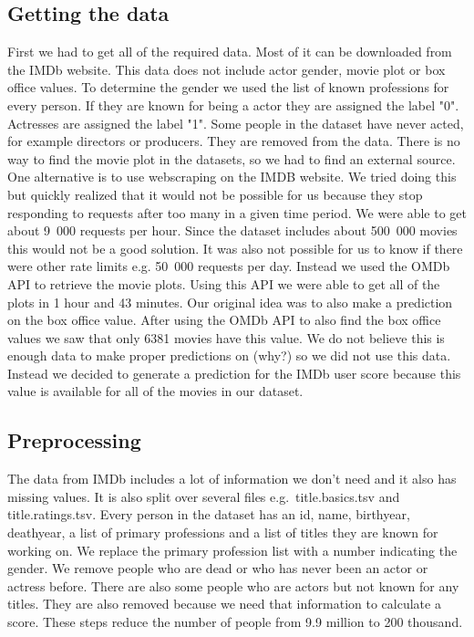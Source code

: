 
\subsection{Getting the data} 
First we had to get all of the required data. Most of it can be downloaded from the IMDb website\cite{IMDbInterfaces}. This data does not include actor gender, movie plot or box office values. To determine the gender we used the list of known professions for every person. If they are known for being a actor they are assigned the label "0". Actresses are assigned the label "1". Some people in the dataset have never acted, for example directors or producers. They are removed from the data. There is no way to find the movie plot in the datasets, so we had to find an external source. One alternative is to use webscraping on the IMDB website. We tried doing this but quickly realized that it would not be possible for us because they stop responding to requests after too many in a given time period. We were able to get about 9~000 requests per hour. Since the dataset includes about 500~000 movies this would not be a good solution. It was also not possible for us to know if there were other rate limits e.g. 50~000 requests per day. Instead we used the OMDb API\cite{OMDb} to retrieve the movie plots. Using this API we were able to get all of the plots in 1 hour and 43 minutes. Our original idea was to also make a prediction on the box office value. After using the OMDb API to also find the box office values we saw that only 6381 movies have this value. We do not believe this is enough data to make proper predictions on (why?) so we did not use this data. Instead we decided to generate a prediction for the IMDb user score because this value is available for all of the movies in our dataset.

\subsection{Preprocessing}
The data from IMDb includes a lot of information we don't need and it also has missing values. It is also split over several files e.g.~title.basics.tsv and title.ratings.tsv. Every person in the dataset has an id, name, birthyear, deathyear, a list of primary professions and a list of titles they are known for working on. We replace the primary profession list with a number indicating the gender. We remove people who are dead or who has never been an actor or actress before. There are also some people who are actors but not known for any titles. They are also removed because we need that information to calculate a score. These steps reduce the number of people from 9.9 million to 200 thousand.

